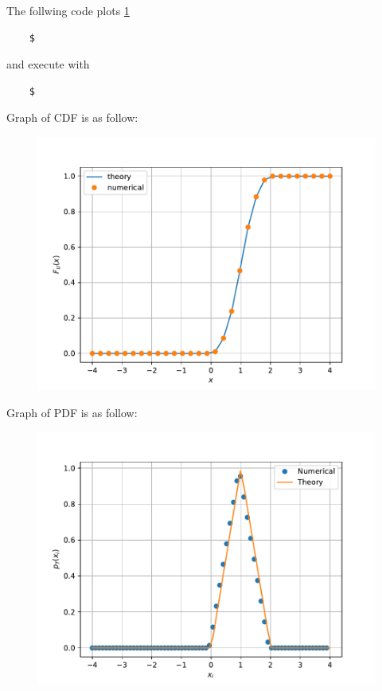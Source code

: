 \documentclass[journal,12pt,twocolumn]{IEEEtran}
\renewcommand\thesection{\arabic{section}}
\begin{document}
\begin{enumerate}[label=\thesection.\arabic*.,ref=\thesection.\theenumi]
    The follwing code plots \ref{fig 4.5}
    \begin{lstlisting}
    $    
    \end{lstlisting}
    and execute with
    \begin{lstlisting}
    $
    \end{lstlisting}
    Graph of CDF is as follow:
    \begin{figure}[H]
        \includegraphics[scale=0.6]{./figs/4.5}
        \label{fig 4.5}
    \end{figure}
    Graph of PDF is as follow:
    \begin{figure}[H]
        \includegraphics[scale=0.6]{./figs/4.6}
        \label{fig 4.6}
    \end{figure}
\end{enumerate}
\end{document}
